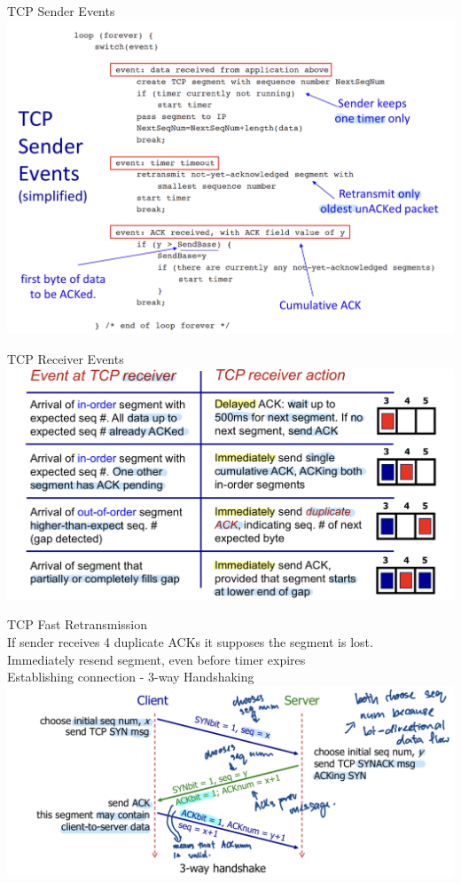 \documentclass[10pt, a4paper]{article}
\newcommand{\blue}[1]{{\color{MidnightBlue}#1}}
\begin{document}
\begin{multicols*}{3}
		TCP Sender Events\\
		\includegraphics[scale=.17]{./assets/tcpSenderEvents}

		TCP Receiver Events\\
		\includegraphics[scale=.15]{./assets/tcpReceiverEvents}

		TCP Fast Retransmission\\
		If sender receives \blue{4 duplicate ACKs} it supposes the segment is lost.\\
		Immediately resend segment, even before timer expires\\

		Establishing connection - 3-way Handshaking\\
		\includegraphics[scale=.15]{./assets/tcpHandshaking}


\end{multicols*}
\end{document}
